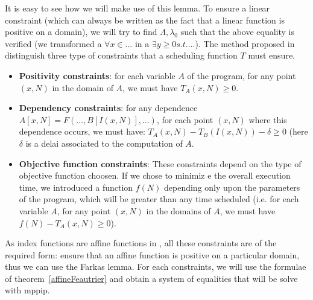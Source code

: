 It is easy to see how we will make use of this lemma. To ensure a linear 
constraint (which can always be written as the fact that a linear function is positive on a domain), we will try to find $\Lambda,\lambda_0$ such that 
the above equality is verified (we transformed a $\forall x \in ...$ in 
a $\exists y\geq 0 s.t....$).  The method proposed 
in~\cite{Feautrier92aa} distinguish
three type of constraints that a  scheduling function $T$ must ensure. 
\begin{itemize}
\item {\bf Positivity constraints}: for each variable $A$ of the program, for any 
point $(x,N)$ in the domain of $A$, we must have $T_A(x,N) \geq 0$.
\item {\bf Dependency constraints}: for any 
dependence $A[x,N] = F(\ldots,B[I(x,N)], \ldots)$, for each point $(x,N)$ 
where this dependence occurs, we must have: 
$T_A(x,N) - T_B(I(x,N)) - \delta \geq 0 $ 
(here $\delta$ is a delai associated to 
the computation of $A$.
\item {\bf Objective function constraints}: These constraints depend on the type of 
objective function choosen. If we chose to minimiz
e the overall execution time, 
we introduced a function $f(N)$ depending only upon the parameters of
 the program, which will be greater than any time scheduled (i.e. for each variable $A$,  for any 
point $(x,N)$ in the domains of $A$, we must have 
$f(N) - T_A(x,N) \geq 0$).
\end{itemize}
As index functions are affine functions
 in \aalpha, all these constraints are of 
the required form: ensure that an affine function is positive on a particular 
domain, thus we can use  the Farkas lemma. 
For each  constraints, we will use the formulae of 
theorem~\ref{affineFeautrier} and 
 obtain a system of equalities that will be solve with mppip.
